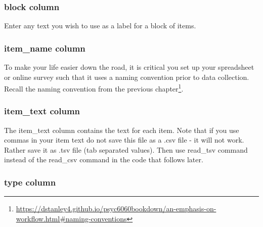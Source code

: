 \documentclass[
]{krantz}
\renewcommand{\href}[2]{#2\footnote{\url{#1}}}
\begin{document}
\hypertarget{block-column}{%
\subsubsection{block column}\label{block-column}}

Enter any text you wish to use as a label for a block of items.

\hypertarget{item_name-column}{%
\subsubsection{item\_name column}\label{item_name-column}}

To make your life easier down the road, it is critical you set up your spreadsheet or online survey such that it uses a naming convention prior to data collection. Recall the \href{https://dstanley4.github.io/psyc6060bookdown/an-emphasis-on-workflow.html\#naming-conventions}{naming convention from the previous chapter}.

\hypertarget{item_text-column}{%
\subsubsection{item\_text column}\label{item_text-column}}

The item\_text column contains the text for each item. Note that if you use commas in your item text do not save this file as a .csv file - it will not work. Rather save it as .tsv file (tab separated values). Then use read\_tsv command instead of the read\_csv command in the code that follows later.

\hypertarget{type-column}{%
\subsubsection{type column}\label{type-column}}
\end{document}
